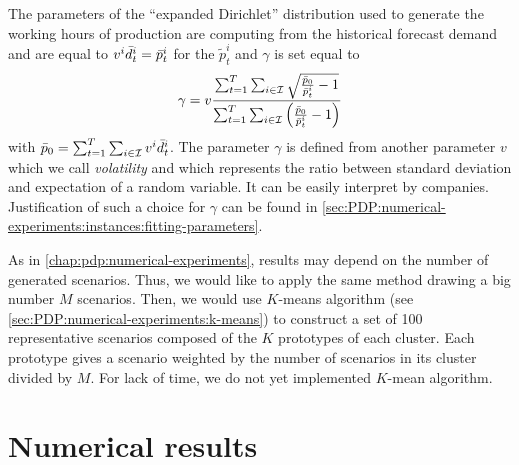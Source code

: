 The parameters of the ``expanded Dirichlet'' distribution used to generate the working hours of production are computing from the historical forecast demand and are equal to $v^i\bar{d}_t^i=\bar{p}_t^i$ for the $\tilde{p}_t^i$ and $\gamma$ is set equal to
\begin{equation}
  \gamma
  =
  v\frac
  {\sum_{t=1}^{\horizon}\sum_{i\in\REF} \sqrt{\frac{\bar{p}_0}{\bar{p}_t^i}-1}}
  {\sum_{t=1}^{\horizon}\sum_{i\in\REF} \bracket{\frac{\bar{p}_0}{\bar{p}_t^i}-1}}
\end{equation}
with $\bar{p}_0 = \sum_{t=1}^{T}\sum_{i\in\mathcal{I}}v^i\bar{d}_t^i$.
The parameter $\gamma$ is defined from another parameter $v$ which we call \emph{volatility} and which represents the ratio between standard deviation and expectation of a random variable.
It can be easily interpret by companies.
Justification of such a choice for $\gamma$ can be found in \cref{sec:PDP:numerical-experiments:instances:fitting-parameters}.


As in \cref{chap:pdp:numerical-experiments}, results may depend on the number of generated scenarios.
Thus, we would like to apply the same method drawing a big number $M$ scenarios.
Then, we would use $K$-means algorithm (see \cref{sec:PDP:numerical-experiments:k-means}) to construct a set of 100 representative scenarios composed of the $K$ prototypes of each cluster.
Each prototype gives a scenario weighted by the number of scenarios in its cluster divided by $M$.
For lack of time, we do not yet implemented $K$-mean algorithm.




\section{Numerical results}
\label{sec:multi-sourcing:numerical-experiments:numerical-results}


